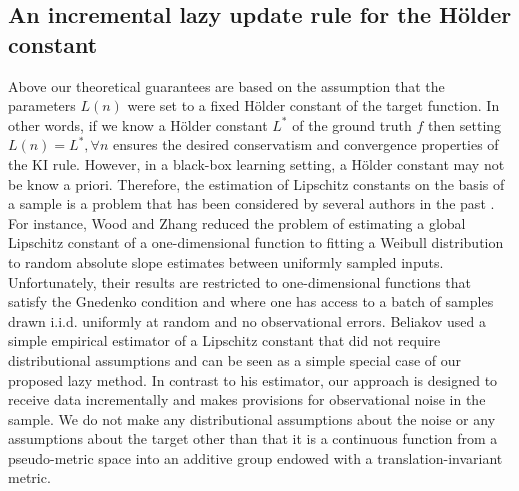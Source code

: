 
\subsection{An incremental lazy update rule for the H\"older constant}
\label{sec:lazyconstants}
Above our theoretical guarantees are based on the assumption that the parameters $L(n)$ were set to a fixed H\"older constant of the target function. In other words, if we know a H\"older constant $L^*$ of the ground truth $f$ then setting $L(n)=L^*,\forall n$ ensures the desired conservatism and convergence properties of the KI rule. However, in a black-box learning setting, a H\"older constant may not be know a priori. Therefore, the estimation of Lipschitz constants on the basis of a sample is a problem that has been considered by several authors in the past \cite{Wood1996,Beliakov2006}. For instance, Wood and Zhang \cite{Wood1996} reduced the problem of estimating a global Lipschitz constant of a one-dimensional function to fitting a Weibull distribution to random absolute slope estimates between uniformly sampled inputs. Unfortunately, their results are restricted to one-dimensional functions that satisfy the Gnedenko condition and where one has access to a batch of samples drawn i.i.d. uniformly at random and no observational errors. Beliakov \cite{Beliakov2006} used a simple empirical estimator of a Lipschitz constant that did not require distributional assumptions and can be seen as a simple special case of our proposed lazy method. In contrast to his estimator, our approach is designed to receive data incrementally and makes provisions for observational noise in the sample. We do not make any distributional assumptions about the noise or any assumptions about the target other than that it is 
a continuous function from a pseudo-metric space into an additive group endowed with a translation-invariant metric. 
  



